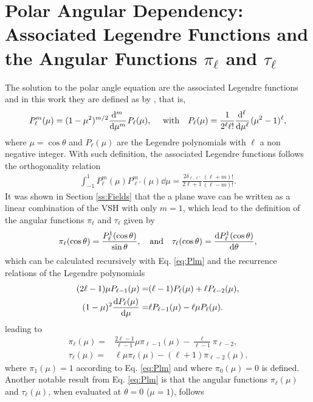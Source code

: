 \section*{Polar Angular Dependency: Associated Legendre Functions and the Angular Functions $\pi_\ell$ and $\tau_\ell$}
The solution to the polar angle equation are the associated Legendre functions and in this work they are defined as by \citeauthor{arfken_mathematical_2001} \cite{arfken_mathematical_2001}, that is,
%
\begin{equation}
P_\ell^m(\mu) = (1-\mu^2)^{m/2}\dv[m]{\,}{\mu}\hspace*{.05em} P_\ell(\mu),
\qqtext{ with}
P_\ell(\mu) = \frac{1}{2^\ell \ell!}\dv[\ell]{\,}{\mu}\hspace*{.05em}  (\mu^2-1)^\ell ,
\label{eq:Plm}
\end{equation}
%
where $\mu = \cos\theta$ and $P_\ell(\mu)$ are the Legendre polynomials with $\ell$ a non negative integer. With such definition, the  associated Legendre functions follows the orthogonality relation
%
\begin{align}
\int_{-1}^1 P_\ell^m(\mu)P_{\ell'}^m(\mu)\dd{\mu} = \frac{2\delta_{\ell,\ell'}}{2\ell+1}\frac{(\ell+m)!}{(\ell-m)!}.
\label{eq:PlmOrtho}
\end{align}
%
It was shown in Section \ref{ss:Fields} that the a plane wave can be written as a linear combination of the VSH with only $m = 1$, which lead to the definition of the angular functions $\pi_\ell$ and $\tau_\ell$ given by
%
\begin{align*}
 \pi_\ell(\cos\theta )  = \frac{P_\ell^1(\cos\theta)}{\sin\theta},\qqtext{and}
 \tau_\ell(\cos\theta) = \dv{P_\ell^1(\cos\theta)}{\theta},
\end{align*}
%
which can be calculated recursively with Eq. \eqref{eq:Plm}  and the recurrence relations of the Legendre polynomials
%
\begin{align}
(2\ell-1)\mu P_{\ell-1}(\mu) =& (\ell-1) P_{\ell}(\mu) + \ell P_{\ell-2}(\mu),\\
(1-\mu)^2\dv{P_\ell(\mu)}{\mu} =& \ell P_{\ell-1}(\mu) - \ell\mu P_\ell(\mu).
\end{align}
%
leading to
%
\begin{align}
\pi_\ell(\mu) =& \frac{2\ell-1}{\ell-1}\mu \pi_{\ell-1}(\mu) - \frac{\ell}{\ell-1}\pi_{\ell-2},\\
\tau_ \ell (\mu) =& \ell\mu\pi_\ell(\mu) - (\ell+1)\pi_{\ell-2}(\mu).
\end{align}
%
where $\pi_1(\mu) = 1$ according to  Eq. \eqref{eq:Plm} and where $\pi_0(\mu)=0$ is defined. Another notable result from Eq. \eqref{eq:Plm} is that the angular functions $\pi_\ell(\mu)$ and $\tau_\ell(\mu)$, when evaluated at $\theta =0$ ($\mu = 1$),  follows
